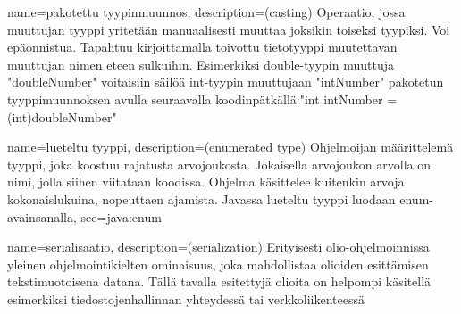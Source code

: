 {
	name=pakotettu tyypinmuunnos,
	description={(casting) Operaatio, jossa muuttujan tyyppi yritetään manuaalisesti muuttaa
joksikin toiseksi tyypiksi. Voi epäonnistua. Tapahtuu kirjoittamalla toivottu tietotyyppi
muutettavan muuttujan nimen eteen sulkuihin. Esimerkiksi double-tyypin muuttuja "doubleNumber"
voitaisiin säilöä int-tyypin muuttujaan "intNumber" pakotetun tyyppimuunnoksen avulla seuraavalla
koodinpätkällä:\newline{}"int intNumber = (int)doubleNumber"}
}

{
	name=lueteltu tyyppi,
	description={(enumerated type) Ohjelmoijan määrittelemä tyyppi, joka koostuu rajatusta
arvojoukosta. Jokaisella arvojoukon arvolla on nimi, jolla siihen viitataan koodissa. Ohjelma
käsittelee kuitenkin arvoja kokonaislukuina, nopeuttaen ajamista. Javassa lueteltu tyyppi luodaan
enum-avainsanalla},
	see={java:enum}
}

{
	name=serialisaatio,
	description={(serialization) Erityisesti olio-ohjelmoinnissa yleinen ohjelmointikielten
ominaisuus, joka mahdollistaa olioiden esittämisen tekstimuotoisena datana. Tällä tavalla
esitettyjä olioita on helpompi käsitellä esimerkiksi tiedostojenhallinnan yhteydessä tai
verkkoliikenteessä}
}